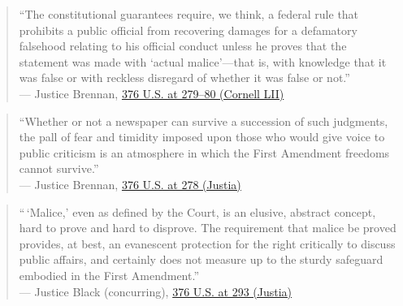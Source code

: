 \documentclass[12pt]{article}
\begin{document}
\begin{quote}
  ``The constitutional guarantees require, we think, a federal rule that prohibits a public official from recovering damages for a defamatory falsehood relating to his official conduct unless he proves that the statement was made with `actual malice'---that is, with knowledge that it was false or with reckless disregard of whether it was false or not.'' \\
  --- Justice Brennan, \href{https://www.law.cornell.edu/supremecourt/text/376/254}{376 U.S. at 279--80 (Cornell LII)}
\end{quote}

\begin{quote}
  ``Whether or not a newspaper can survive a succession of such judgments, the pall of fear and timidity imposed upon those who would give voice to public criticism is an atmosphere in which the First Amendment freedoms cannot survive.'' \\
  --- Justice Brennan, \href{https://supreme.justia.com/cases/federal/us/376/254/}{376 U.S. at 278 (Justia)}
\end{quote}

\begin{quote}
  ``\,`Malice,' even as defined by the Court, is an elusive, abstract concept, hard to prove and hard to disprove. The requirement that malice be proved provides, at best, an evanescent protection for the right critically to discuss public affairs, and certainly does not measure up to the sturdy safeguard embodied in the First Amendment.'' \\
  --- Justice Black (concurring), \href{https://supreme.justia.com/cases/federal/us/376/254/}{376 U.S. at 293 (Justia)}
\end{quote}
\end{document}

